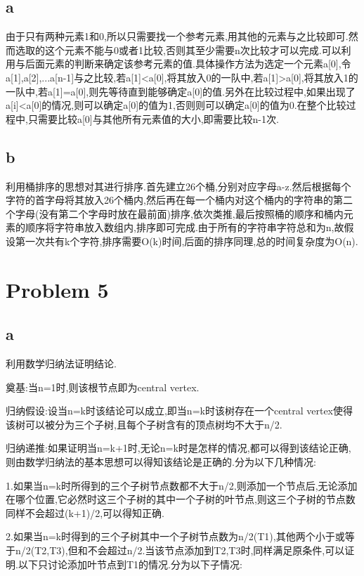 \documentclass[12pt,a4paper,fontset=none]{ctexart}
\begin{document}
\subsection*{a}
由于只有两种元素1和0,所以只需要找一个参考元素,用其他的元素与之比较即可.然而选取的这个元素不能与0或者1比较,否则其至少需要n次比较才可以完成.可以利用与后面元素的判断来确定该参考元素的值.具体操作方法为选定一个元素a[0],令a[1],a[2],...a[n-1]与之比较,若a[1]<a[0],将其放入0的一队中,若a[1]>a[0],将其放入1的一队中,若a[1]=a[0],则先等待直到能够确定a[0]的值.另外在比较过程中,如果出现了a[i]<a[0]的情况,则可以确定a[0]的值为1,否则则可以确定a[0]的值为0.在整个比较过程中,只需要比较a[0]与其他所有元素值的大小,即需要比较n-1次.
\subsection*{b}
利用桶排序的思想对其进行排序.首先建立26个桶,分别对应字母a-z.然后根据每个字符的首字母将其放入26个桶内,然后再在每一个桶内对这个桶内的字符串的第二个字母(没有第二个字母时放在最前面)排序,依次类推,最后按照桶的顺序和桶内元素的顺序将字符串放入数组内,排序即可完成.由于所有的字符串字符总和为n,故假设第一次共有k个字符,排序需要O(k)时间,后面的排序同理,总的时间复杂度为O(n).
\section*{Problem 5}
\subsection*{a}
利用数学归纳法证明结论.

奠基:当n=1时,则该根节点即为central vertex.

归纳假设:设当n=k时该结论可以成立,即当n=k时该树存在一个central vertex使得该树可以被分为三个子树,且每个子树含有的顶点树均不大于n/2.

归纳递推:如果证明当n=k+1时,无论n=k时是怎样的情况,都可以得到该结论正确,则由数学归纳法的基本思想可以得知该结论是正确的.分为以下几种情况:

1.如果当n=k时所得到的三个子树节点数都不大于n/2,则添加一个节点后,无论添加在哪个位置,它必然时这三个子树的其中一个子树的叶节点,则这三个子树的节点数同样不会超过(k+1)/2,可以得知正确.

2.如果当n=k时得到的三个子树其中一个子树节点数为n/2(T1),其他两个小于或等于n/2(T2,T3),但和不会超过n/2.当该节点添加到T2,T3时,同样满足原条件,可以证明.以下只讨论添加叶节点到T1的情况.分为以下子情况:
\end{document}
